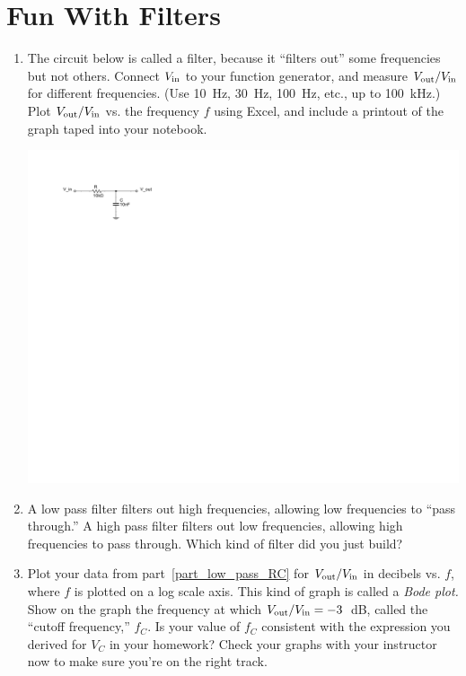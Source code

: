 \section{Fun With Filters}
\label{lab_filters}


\bigskip

\begin{enumerate}[wide]

\item The circuit below is called a filter, because it ``filters out'' some frequencies but not others.  Connect $V_{\rm in}$ to your function generator, and measure $V_{\rm out}/V_{\rm in}$ for different frequencies.  (Use 10~Hz, 30~Hz, 100~Hz, etc., up to 100~kHz.)  Plot $V_{\rm out}/V_{\rm in}$ vs. the frequency $f$ using Excel, and include a printout of the graph taped into your notebook.  \label{part_low_pass_RC}
\begin{center}
\includegraphics{filters/low_pass_filter_RC.pdf}
\end{center}

\item A low pass filter filters out high frequencies, allowing low frequencies to ``pass through.''  A high pass filter filters out low frequencies, allowing high frequencies to pass through.  Which kind of filter did you just build?  

\item Plot your data from part~\ref{part_low_pass_RC} for $V_{\rm out}/V_{\rm in}$ in decibels vs. $f$, where $f$ is plotted on a log scale axis.  This kind of graph is called a \textit{Bode plot.}  Show on the graph the frequency at which $V_{\rm out}/V_{\rm in}=-3$~dB, called the ``cutoff frequency,'' $f_C$.  Is your value of $f_C$ consistent with the expression you derived for $V_C$ in your homework?  Check your graphs with your instructor now to make sure you're on the right track.\label{part_low_pass_log_plot}


\end{enumerate}
